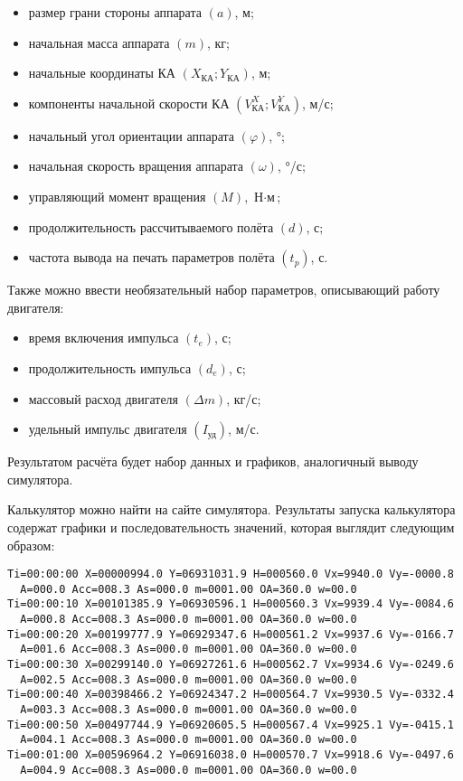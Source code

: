 \documentclass[12pt,a4paper]{article}
\begin{document}
\begin{itemize}
\item размер грани стороны аппарата $(a)$, м;
\item начальная масса аппарата $(m)$, кг;
\item начальные координаты КА $(X_{\text{КА}}; Y_{\text{КА}})$, м;
\item компоненты начальной скорости КА $(V^X_{\text{КА}}; V^Y_{\text{КА}})$, м/с;
\item начальный угол ориентации аппарата $(\varphi)$, °;
\item начальная скорость вращения аппарата $(\omega)$, °/с;
\item управляющий момент вращения $(M)$, $\text{Н} \cdot \text{м}$;
\item продолжительность рассчитываемого полёта $(d)$, с;
\item частота вывода на печать параметров полёта $(t_p)$, с.
\end{itemize}

Также можно ввести необязательный набор параметров, описывающий работу двигателя:

\begin{itemize}
\item время включения импульса $(t_e)$, с;
\item продолжительность импульса $(d_e)$, с;
\item массовый расход двигателя $(\Delta m)$, кг/с;
\item удельный импульс двигателя $(I_{\text{уд}})$, м/с.
\end{itemize}

Результатом расчёта будет набор данных и графиков, аналогичный выводу симулятора.

Калькулятор можно найти на сайте симулятора. Результаты запуска калькулятора содержат
графики и последовательность значений, которая выглядит следующим образом:

\begin{verbatim}
Ti=00:00:00 X=00000994.0 Y=06931031.9 H=000560.0 Vx=9940.0 Vy=-0000.8
  A=000.0 Acc=008.3 As=000.0 m=0001.00 OA=360.0 w=00.0
Ti=00:00:10 X=00101385.9 Y=06930596.1 H=000560.3 Vx=9939.4 Vy=-0084.6
  A=000.8 Acc=008.3 As=000.0 m=0001.00 OA=360.0 w=00.0
Ti=00:00:20 X=00199777.9 Y=06929347.6 H=000561.2 Vx=9937.6 Vy=-0166.7
  A=001.6 Acc=008.3 As=000.0 m=0001.00 OA=360.0 w=00.0
Ti=00:00:30 X=00299140.0 Y=06927261.6 H=000562.7 Vx=9934.6 Vy=-0249.6
  A=002.5 Acc=008.3 As=000.0 m=0001.00 OA=360.0 w=00.0
Ti=00:00:40 X=00398466.2 Y=06924347.2 H=000564.7 Vx=9930.5 Vy=-0332.4
  A=003.3 Acc=008.3 As=000.0 m=0001.00 OA=360.0 w=00.0
Ti=00:00:50 X=00497744.9 Y=06920605.5 H=000567.4 Vx=9925.1 Vy=-0415.1
  A=004.1 Acc=008.3 As=000.0 m=0001.00 OA=360.0 w=00.0
Ti=00:01:00 X=00596964.2 Y=06916038.0 H=000570.7 Vx=9918.6 Vy=-0497.6
  A=004.9 Acc=008.3 As=000.0 m=0001.00 OA=360.0 w=00.0
\end{verbatim}
\end{document}
